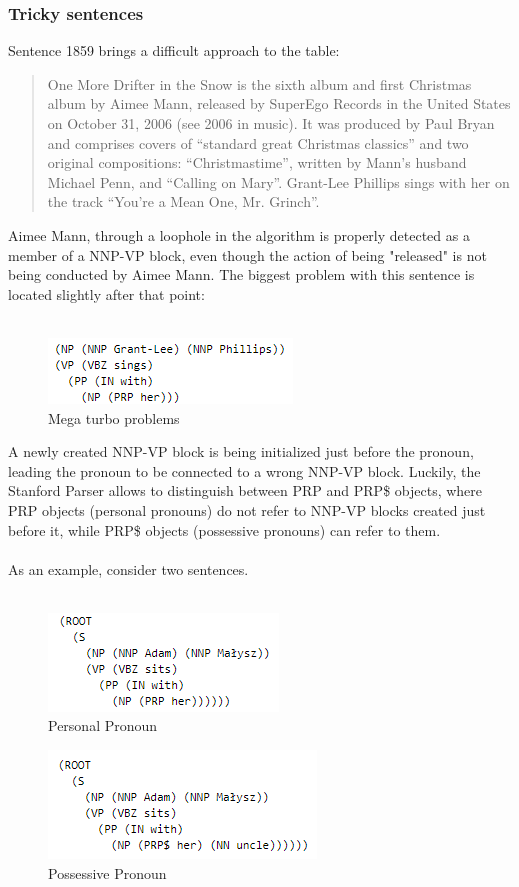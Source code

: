 \documentclass{article}
\begin{document}
\subsubsection{Tricky sentences}
Sentence 1859 brings a difficult approach to the table:
\begin{quote}
    One More Drifter in the Snow is the sixth album and first Christmas album by Aimee Mann, released by SuperEgo Records in the United States on October 31, 2006 (see 2006 in music). It was produced by Paul Bryan and comprises covers of ``standard great Christmas classics'' and two original compositions: ``Christmastime'', written by Mann's husband Michael Penn, and ``Calling on Mary''. Grant-Lee Phillips sings with her on the track ``You're a Mean One, Mr. Grinch''.
\end{quote}
Aimee Mann, through a loophole in the algorithm is properly detected as a member of a NNP-VP block, even though the action of being "released" is not being conducted by Aimee Mann. The biggest problem with this sentence is located slightly after that point: \\ \\
\begin{figure}[h!]
    \centering
\includegraphics[]{Example6.png}
    \caption{Mega turbo problems}
\end{figure}
\newpage
\noindent A newly created NNP-VP block is being initialized just before the pronoun, leading the pronoun to be connected to a wrong NNP-VP block. Luckily, the Stanford Parser allows to distinguish between PRP and PRP\$ objects, where PRP objects (personal pronouns) do not refer to NNP-VP blocks created just before it, while PRP\$ objects (possessive pronouns) can refer to them.\\ \\
As an example, consider two sentences. \\ \\
\begin{figure}[h!]
    \centering
\includegraphics[]{Example7.png}
    \caption{Personal Pronoun}
\end{figure}
\begin{figure}[h!]
    \centering
\includegraphics[]{Example8.png}
    \caption{Possessive Pronoun}
\end{figure}
\end{document}
